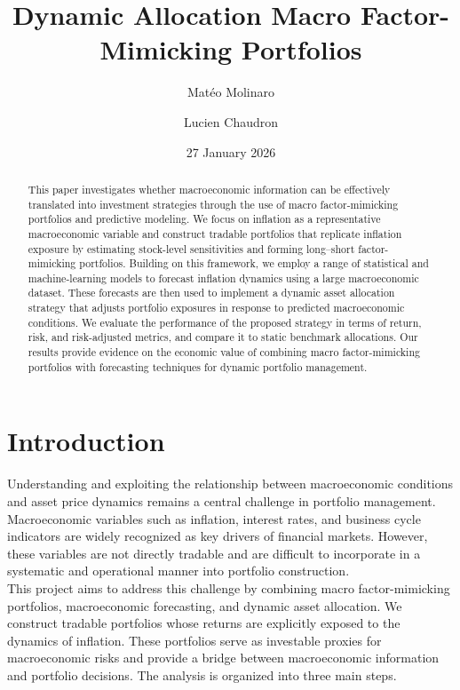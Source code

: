 \documentclass{article}
\title{Dynamic Allocation Macro Factor-Mimicking Portfolios}
\author{Matéo Molinaro \and Lucien Chaudron}
\date{27 January 2026}
\begin{document}
\maketitle

\begin{abstract}
This paper investigates whether macroeconomic information can be effectively translated into investment strategies through the use of macro factor-mimicking portfolios and predictive modeling. We focus on inflation as a representative macroeconomic variable and construct tradable portfolios that replicate inflation exposure by estimating stock-level sensitivities and forming long--short factor-mimicking portfolios. Building on this framework, we employ a range of statistical and machine-learning models to forecast inflation dynamics using a large macroeconomic dataset. These forecasts are then used to implement a dynamic asset allocation strategy that adjusts portfolio exposures in response to predicted macroeconomic conditions. We evaluate the performance of the proposed strategy in terms of return, risk, and risk-adjusted metrics, and compare it to static benchmark allocations. Our results provide evidence on the economic value of combining macro factor-mimicking portfolios with forecasting techniques for dynamic portfolio management.
\end{abstract}

\tableofcontents
\newpage

\section{Introduction}

Understanding and exploiting the relationship between macroeconomic conditions and asset price dynamics remains a central challenge in portfolio management. Macroeconomic variables such as inflation, interest rates, and business cycle indicators are widely recognized as key drivers of financial markets. However, these variables are not directly tradable and are difficult to incorporate in a systematic and operational manner into portfolio construction.\\

This project aims to address this challenge by combining macro factor-mimicking portfolios, macroeconomic forecasting, and dynamic asset allocation. We construct tradable portfolios whose returns are explicitly exposed to the dynamics of inflation. These portfolios serve as investable proxies for macroeconomic risks and provide a bridge between macroeconomic information and portfolio decisions. The analysis is organized into three main steps.\\
\end{document}
